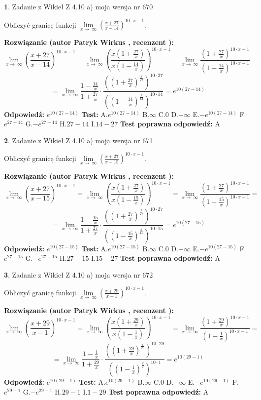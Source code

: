 \documentclass[12pt, a4paper]{article}
\theoremstyle{definition} %
\newtheorem{zad}{}
\newcommand{\zadStart}[1]{\begin{zad}#1\newline}
\newcommand{\zadStop}{\end{zad}}
\newcommand{\rozwStart}[2]{\noindent \textbf{Rozwiązanie (autor #1 , recenzent #2): }\newline}
\newcommand{\rozwStop}{\newline}
\newcommand{\odpStart}{\noindent \textbf{Odpowiedź:}\newline}
\newcommand{\odpStop}{\newline}
\newcommand{\testStart}{\noindent \textbf{Test:}\newline}
\newcommand{\testStop}{\newline}
\newcommand{\kluczStart}{\noindent \textbf{Test poprawna odpowiedź:}\newline}
\newcommand{\kluczStop}{\newline}
\begin{document}
\zadStart{Zadanie z Wikieł Z 4.10 a) moja wersja nr 670}


Obliczyć granicę funkcji  $\lim\limits_{x\to\ \infty}(\frac{x+27}{x-14})^{10\cdot x-1}$.
\zadStop
\rozwStart{Patryk Wirkus}{}
$$\lim\limits_{x\to\ \infty}(\frac{x+27}{x-14})^{10\cdot x-1} = \lim\limits_{x\to\ \infty}(\frac{x(1+\frac{27}{x})}{x(1-\frac{14}{x})})^{10\cdot x-1}=\lim\limits_{x\to\ \infty}\frac{(1+\frac{27}{x})^{10\cdot x-1}}{(1-\frac{14}{x})^{10\cdot x-1}}=$$
$$=\lim\limits_{x\to\ \infty}\frac{1-\frac{14}{x}}{1+\frac{27}{x}}\cdot\frac{((1+\frac{27}{x})^{\frac{x}{27}})^{10\cdot27}}{((1-\frac{14}{x})^{\frac{x}{14}})^{10\cdot14}}=e^{10(27-14)}$$
\rozwStop
\odpStart
$e^{10(27-14)}$
\odpStop
\testStart
A.$e^{10(27-14)}$ B.$\infty$ C.$0$ D.$-\infty$ E.$-e^{10(27-14)}$
F.$e^{27-14}$ G.$-e^{27-14}$
H.$27-14$
I.$14-27$
\testStop
\kluczStart
A
\kluczStop



\zadStart{Zadanie z Wikieł Z 4.10 a) moja wersja nr 671}


Obliczyć granicę funkcji  $\lim\limits_{x\to\ \infty}(\frac{x+27}{x-15})^{10\cdot x-1}$.
\zadStop
\rozwStart{Patryk Wirkus}{}
$$\lim\limits_{x\to\ \infty}(\frac{x+27}{x-15})^{10\cdot x-1} = \lim\limits_{x\to\ \infty}(\frac{x(1+\frac{27}{x})}{x(1-\frac{15}{x})})^{10\cdot x-1}=\lim\limits_{x\to\ \infty}\frac{(1+\frac{27}{x})^{10\cdot x-1}}{(1-\frac{15}{x})^{10\cdot x-1}}=$$
$$=\lim\limits_{x\to\ \infty}\frac{1-\frac{15}{x}}{1+\frac{27}{x}}\cdot\frac{((1+\frac{27}{x})^{\frac{x}{27}})^{10\cdot27}}{((1-\frac{15}{x})^{\frac{x}{15}})^{10\cdot15}}=e^{10(27-15)}$$
\rozwStop
\odpStart
$e^{10(27-15)}$
\odpStop
\testStart
A.$e^{10(27-15)}$ B.$\infty$ C.$0$ D.$-\infty$ E.$-e^{10(27-15)}$
F.$e^{27-15}$ G.$-e^{27-15}$
H.$27-15$
I.$15-27$
\testStop
\kluczStart
A
\kluczStop



\zadStart{Zadanie z Wikieł Z 4.10 a) moja wersja nr 672}


Obliczyć granicę funkcji  $\lim\limits_{x\to\ \infty}(\frac{x+29}{x-1})^{10\cdot x-1}$.
\zadStop
\rozwStart{Patryk Wirkus}{}
$$\lim\limits_{x\to\ \infty}(\frac{x+29}{x-1})^{10\cdot x-1} = \lim\limits_{x\to\ \infty}(\frac{x(1+\frac{29}{x})}{x(1-\frac{1}{x})})^{10\cdot x-1}=\lim\limits_{x\to\ \infty}\frac{(1+\frac{29}{x})^{10\cdot x-1}}{(1-\frac{1}{x})^{10\cdot x-1}}=$$
$$=\lim\limits_{x\to\ \infty}\frac{1-\frac{1}{x}}{1+\frac{29}{x}}\cdot\frac{((1+\frac{29}{x})^{\frac{x}{29}})^{10\cdot29}}{((1-\frac{1}{x})^{\frac{x}{1}})^{10\cdot1}}=e^{10(29-1)}$$
\rozwStop
\odpStart
$e^{10(29-1)}$
\odpStop
\testStart
A.$e^{10(29-1)}$ B.$\infty$ C.$0$ D.$-\infty$ E.$-e^{10(29-1)}$
F.$e^{29-1}$ G.$-e^{29-1}$
H.$29-1$
I.$1-29$
\testStop
\kluczStart
A
\kluczStop
\end{document}
